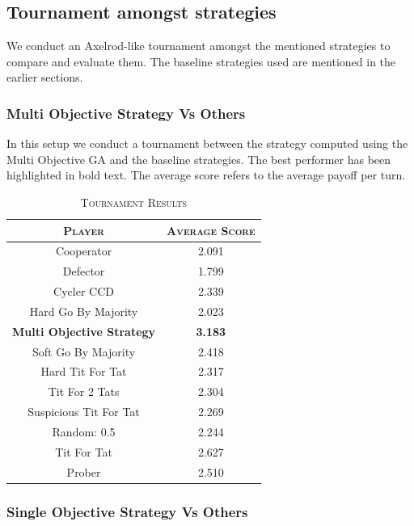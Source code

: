 \documentclass[a4paper]{article}
\begin{document}
	\subsection{Tournament amongst strategies}

	We conduct an Axelrod-like tournament amongst the mentioned strategies to compare and evaluate them. The baseline strategies used are mentioned in the earlier sections.

	\subsubsection{Multi Objective Strategy Vs Others}

	In this setup we conduct a tournament between the strategy computed using the Multi Objective GA and the baseline strategies. The best performer has been highlighted in bold text. The average score refers to the average payoff per turn.

	\begin{table}[H]
	  \begin{center}
	    \begin{tabular}{c|c}
	      \toprule
	      \textsc{Player} & \textsc{Average Score}\\
	      \midrule
			Cooperator & 2.091\\
			Defector & 1.799\\
			Cycler CCD & 2.339\\
			Hard Go By Majority & 2.023\\
			\textbf{Multi Objective Strategy} & \textbf{3.183}\\
			Soft Go By Majority & 2.418\\
			Hard Tit For Tat & 2.317\\
			Tit For 2 Tats & 2.304\\
			Suspicious Tit For Tat & 2.269\\
			Random: 0.5 & 2.244\\
			Tit For Tat & 2.627\\
			Prober & 2.510\\
		  \bottomrule
	    \end{tabular}
	    \caption{\textsc{Tournament Results}}
	  \end{center}
	\end{table}  

	\subsubsection{Single Objective Strategy Vs Others}
\end{document}
